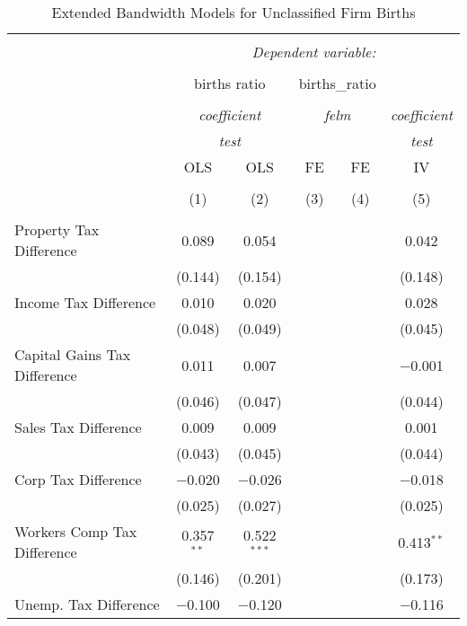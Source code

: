 
\begin{table}[!htbp] \centering 
  \caption{Extended Bandwidth Models for  Unclassified Firm Births} 
  \label{} 
\begin{tabular}{@{\extracolsep{5pt}}lccccc} 
\\[-1.8ex]\hline 
\hline \\[-1.8ex] 
 & \multicolumn{5}{c}{\textit{Dependent variable:}} \\ 
\cline{2-6} 
\\[-1.8ex] & \multicolumn{2}{c}{births ratio} & \multicolumn{2}{c}{births\_ratio} &   \\ 
\\[-1.8ex] & \multicolumn{2}{c}{\textit{coefficient}} & \multicolumn{2}{c}{\textit{felm}} & \textit{coefficient} \\ 
 & \multicolumn{2}{c}{\textit{test}} & \multicolumn{2}{c}{\textit{}} & \textit{test} \\ 
 & OLS & OLS & FE & FE & IV \\ 
\\[-1.8ex] & (1) & (2) & (3) & (4) & (5)\\ 
\hline \\[-1.8ex] 
 Property Tax Difference & 0.089 & 0.054 &  &  & 0.042 \\ 
  & (0.144) & (0.154) &  &  & (0.148) \\ 
  Income Tax Difference & 0.010 & 0.020 &  &  & 0.028 \\ 
  & (0.048) & (0.049) &  &  & (0.045) \\ 
  Capital Gains Tax Difference & 0.011 & 0.007 &  &  & $-$0.001 \\ 
  & (0.046) & (0.047) &  &  & (0.044) \\ 
  Sales Tax Difference & 0.009 & 0.009 &  &  & 0.001 \\ 
  & (0.043) & (0.045) &  &  & (0.044) \\ 
  Corp Tax Difference & $-$0.020 & $-$0.026 &  &  & $-$0.018 \\ 
  & (0.025) & (0.027) &  &  & (0.025) \\ 
  Workers Comp Tax Difference & 0.357$^{**}$ & 0.522$^{***}$ &  &  & 0.413$^{**}$ \\ 
  & (0.146) & (0.201) &  &  & (0.173) \\ 
  Unemp. Tax Difference & $-$0.100 & $-$0.120 &  &  & $-$0.116 \\ 

\end{tabular}
\end{table}
